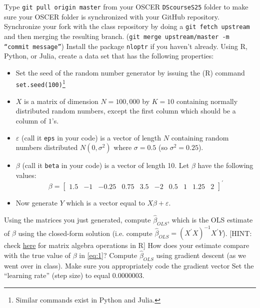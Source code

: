 \documentclass[12pt,english]{exam}
\begin{document}
\begin{questions}
\question Type \texttt{git pull origin master} from your OSCER \texttt{DScourseS25} folder to make sure your OSCER folder is synchronized with your GitHub repository. 
\question Synchronize your fork with the class repository by doing a \texttt{git fetch upstream} and then merging the resulting branch. (\texttt{git merge upstream/master -m ``commit message''})
\question Install the package \texttt{nloptr} if you haven't already.
\question Using R, Python, or Julia, create a data set that has the following properties:
\begin{itemize}
    \item Set the seed of the random number generator by issuing the (R) command \texttt{set.seed(100)}\footnote{Similar commands exist in Python and Julia.}
    \item $X$ is a matrix of dimension $N=100,000$ by $K=10$ containing normally distributed random numbers, except the first column which should be a column of $1$'s. 
    \item $\varepsilon$ (call it \texttt{eps} in your code) is a vector of length $N$ containing random numbers distributed $N\left(0,\sigma^{2}\right)$ where $\sigma=0.5$ (so $\sigma^{2} = 0.25$).
    \item $\beta$ (call it \texttt{beta} in your code) is a vector of length 10. Let $\beta$ have the following values:
        \begin{equation}
            \label{eq:1}
           \beta = \left[\begin{array}{cccccccccc}
            1.5 & -1 & -0.25 & 0.75 & 3.5 & -2 & 0.5 & 1 & 1.25 & 2
            \end{array}\right]^{\prime}
        \end{equation}
    \item Now generate $Y$ which is a vector equal to $X\beta + \varepsilon$.
\end{itemize}
\question Using the matrices you just generated, compute $\hat{\beta}_{OLS}$, which is the OLS estimate of $\beta$ using the closed-form solution (i.e. compute $\hat{\beta}_{OLS} = \left(X^{\prime}X\right)^{-1}X^{\prime}Y$). [HINT: check \href{https://www.statmethods.net/advstats/matrix.html}{here} for matrix algebra operations in R] How does your estimate compare with the true value of $\beta$ in \eqref{eq:1}?
\question Compute $\hat{\beta}_{OLS}$ using gradient descent (as we went over in class). Make sure you appropriately code the gradient vector Set the ``learning rate'' (step size) to equal 0.0000003.

\end{questions}
\end{document}
